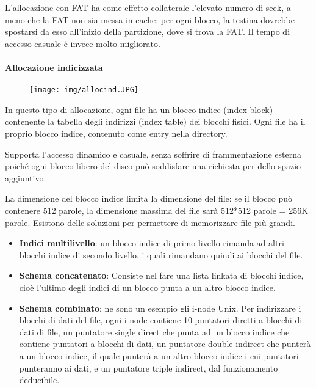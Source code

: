 \documentclass[a4]{article}
\begin{document}
L'allocazione con FAT ha come effetto collaterale l'elevato numero di seek, a meno che la FAT non sia messa in cache: per ogni blocco, la testina dovrebbe spostarsi da esso all'inizio della partizione, dove si trova la FAT. Il tempo di accesso casuale è invece molto migliorato.

\paragraph{Allocazione indicizzata}
\begin{figure}[h!]
    \centering
    \texttt{[image: img/allocind.JPG]}
\end{figure}
In questo tipo di allocazione, ogni file ha un blocco indice (index block) contenente la tabella degli indirizzi (index table) dei blocchi fisici. Ogni file ha il proprio blocco indice, contenuto come entry nella directory.

Supporta l'accesso dinamico e casuale, senza soffrire di frammentazione esterna poiché ogni blocco libero del disco può soddisfare una richiesta per dello spazio aggiuntivo.

La dimensione del blocco indice limita la dimensione del file: se il blocco può contenere 512 parole, la dimensione massima del file sarà 512*512 parole = 256K parole. Esistono delle soluzioni per permettere di memorizzare file più grandi.
\begin{itemize}
    \item \textbf{Indici multilivello}: un blocco indice di primo livello rimanda ad altri blocchi indice di secondo livello, i quali rimandano quindi ai blocchi del file.
    \item \textbf{Schema concatenato}: Consiste nel fare una lista linkata di blocchi indice, cioè l'ultimo degli indici di un blocco punta a un altro blocco indice.
    \item \textbf{Schema combinato}: ne sono un esempio gli i-node Unix. Per indirizzare i blocchi di dati del file, ogni i-node contiene 10 puntatori diretti a blocchi di dati di file, un puntatore single direct che punta ad un blocco indice che contiene puntatori a blocchi di dati, un puntatore double indirect che punterà a un blocco indice, il quale punterà a un altro blocco indice i cui puntatori punteranno ai dati, e un puntatore triple indirect, dal funzionamento deducibile.
\end{itemize}
\end{document}
